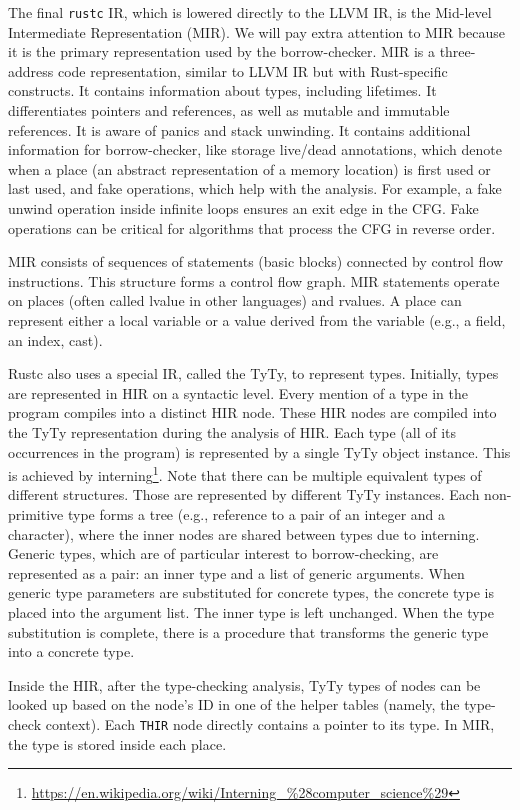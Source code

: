 \documentclass[
  11pt,
  twoside,symmetric]{report}
\DeclareRobustCommand{\href}[2]{#2\footnote{\url{#1}}}
\begin{document}
The final \texttt{rustc} IR, which is lowered directly to the LLVM IR,
is the Mid-level Intermediate Representation (MIR). We will pay extra
attention to MIR because it is the primary representation used by the
borrow-checker. MIR is a three-address code representation, similar to
LLVM IR but with Rust-specific constructs. It contains information about
types, including lifetimes. It differentiates pointers and references,
as well as mutable and immutable references. It is aware of panics and
stack unwinding. It contains additional information for borrow-checker,
like storage live/dead annotations, which denote when a place (an
abstract representation of a memory location) is first used or last
used, and fake operations, which help with the analysis. For example, a
fake unwind operation inside infinite loops ensures an exit edge in the
CFG. Fake operations can be critical for algorithms that process the CFG
in reverse order.

MIR consists of sequences of statements (basic blocks) connected by
control flow instructions. This structure forms a control flow graph.
MIR statements operate on places (often called lvalue in other
languages) and rvalues. A place can represent either a local variable or
a value derived from the variable (e.g., a field, an index, cast).

Rustc also uses a special IR, called the TyTy, to represent types.
Initially, types are represented in HIR on a syntactic level. Every
mention of a type in the program compiles into a distinct HIR node.
These HIR nodes are compiled into the TyTy representation during the
analysis of HIR. Each type (all of its occurrences in the program) is
represented by a single TyTy object instance. This is achieved by
\href{https://en.wikipedia.org/wiki/Interning_\%28computer_science\%29}{interning}.
Note that there can be multiple equivalent types of different
structures. Those are represented by different TyTy instances. Each
non-primitive type forms a tree (e.g., reference to a pair of an integer
and a character), where the inner nodes are shared between types due to
interning. Generic types, which are of particular interest to
borrow-checking, are represented as a pair: an inner type and a list of
generic arguments. When generic type parameters are substituted for
concrete types, the concrete type is placed into the argument list. The
inner type is left unchanged. When the type substitution is complete,
there is a procedure that transforms the generic type into a concrete
type.

Inside the HIR, after the type-checking analysis, TyTy types of nodes
can be looked up based on the node's ID in one of the helper tables
(namely, the type-check context). Each \texttt{THIR} node directly
contains a pointer to its type. In MIR, the type is stored inside each
place.
\end{document}
